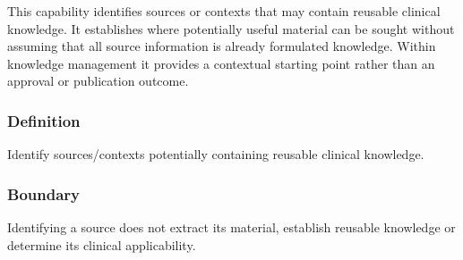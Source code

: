 This capability identifies sources or contexts that may contain reusable clinical knowledge. It establishes where potentially useful material can be sought without assuming that all source information is already formulated knowledge. Within knowledge management it provides a contextual starting point rather than an approval or publication outcome.

\subsubsection*{Definition}

Identify sources/\allowbreak{}contexts potentially containing reusable clinical knowledge.

\subsubsection*{Boundary}

Identifying a source does not extract its material, establish reusable knowledge or determine its clinical applicability.

